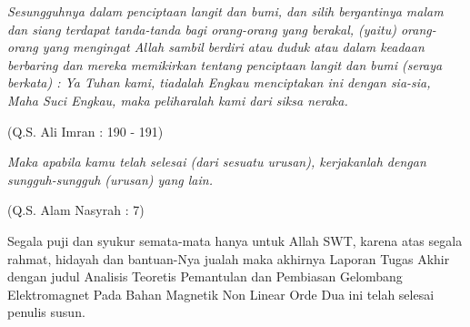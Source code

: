 \documentclass[laporan]{ugmlaporanta}
\begin{document}
\cover

\titlepageind 

\approvalpage

\declarepage

\acknowledment
\begin{flushright}
\Large\emph{}
\end{flushright}

\motto
\emph{Sesungguhnya dalam penciptaan langit dan bumi, dan silih bergantinya
malam dan siang terdapat tanda-tanda bagi orang-orang yang berakal, (yaitu)
orang-orang yang mengingat Allah sambil berdiri atau duduk atau dalam keadaan
berbaring dan mereka memikirkan tentang penciptaan langit dan bumi (seraya
berkata) : Ya Tuhan kami, tiadalah Engkau menciptakan ini dengan sia-sia, Maha
Suci Engkau, maka peliharalah kami dari siksa neraka.}

\begin{flushright}
(Q.S. Ali Imran : 190 - 191)
\end{flushright}

\emph{Maka apabila kamu telah selesai (dari sesuatu urusan), kerjakanlah
dengan sungguh-sungguh (urusan) yang lain.}

\begin{flushright}
(Q.S. Alam Nasyrah : 7)
\end{flushright}

\preface
Segala puji dan syukur semata-mata hanya untuk Allah SWT, karena atas segala
rahmat, hidayah dan bantuan-Nya jualah maka akhirnya Laporan Tugas Akhir dengan judul
Analisis Teoretis Pemantulan dan Pembiasan Gelombang Elektromagnet Pada
Bahan Magnetik Non Linear Orde Dua ini telah selesai penulis susun.
\end{document}
